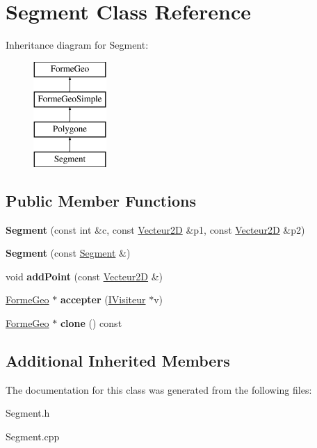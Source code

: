 \hypertarget{class_segment}{}\section{Segment Class Reference}
\label{class_segment}
Inheritance diagram for Segment\+:\begin{figure}[H]
\begin{center}
\leavevmode
\includegraphics[height=4.000000cm]{dd/dd2/class_segment}
\end{center}
\end{figure}
\subsection*{Public Member Functions}
\begin{DoxyCompactItemize}
\item 
\mbox{\label{class_segment_ab405c5e405d641375e1d412f5217aebb}} 
{\bfseries Segment} (const int \&c, const \mbox{\hyperlink{class_vecteur2_d}{Vecteur2D}} \&p1, const \mbox{\hyperlink{class_vecteur2_d}{Vecteur2D}} \&p2)
\item 
\mbox{\label{class_segment_a434101e98c062bde4ed6f06186396386}} 
{\bfseries Segment} (const \mbox{\hyperlink{class_segment}{Segment}} \&)
\item 
\mbox{\label{class_segment_a970f2c2daa95e2878de510f95762d5b4}} 
void {\bfseries add\+Point} (const \mbox{\hyperlink{class_vecteur2_d}{Vecteur2D}} \&)
\item 
\mbox{\label{class_segment_af3e4585e33a5c6748a787d4ef180b0b5}} 
\mbox{\hyperlink{class_forme_geo}{Forme\+Geo}} $\ast$ {\bfseries accepter} (\mbox{\hyperlink{class_i_visiteur}{I\+Visiteur}} $\ast$v)
\item 
\mbox{\label{class_segment_af03cb6065b8ff6571c2fd7825070e13b}} 
\mbox{\hyperlink{class_forme_geo}{Forme\+Geo}} $\ast$ {\bfseries clone} () const
\end{DoxyCompactItemize}
\subsection*{Additional Inherited Members}


The documentation for this class was generated from the following files\+:\begin{DoxyCompactItemize}
\item 
Segment.\+h\item 
Segment.\+cpp\end{DoxyCompactItemize}
